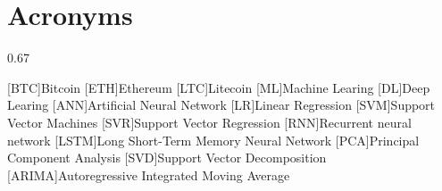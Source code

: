 \chapter*{Acronyms}

\begin{acronym}[ARIMA]
{\setlength{\baselineskip}%
{0.67\baselineskip}

[BTC]{Bitcoin}
[ETH]{Ethereum}
[LTC]{Litecoin}
[ML]{Machine Learing}
[DL]{Deep Learing}
[ANN]{Artificial Neural Network}
[LR]{Linear Regression}
[SVM]{Support Vector Machines}
[SVR]{Support Vector Regression}
[RNN]{Recurrent neural network}
[LSTM]{Long Short-Term Memory Neural Network}
[PCA]{Principal Component Analysis}
[SVD]{Support Vector Decomposition}
[ARIMA]{Autoregressive Integrated Moving Average}



\par}
\end{acronym}